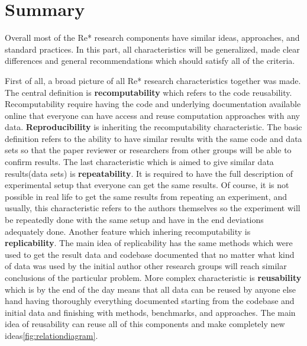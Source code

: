 \documentclass{vldb}
\begin{document}
\section{Summary}
Overall most of the Re* research components have similar ideas, approaches, and standard practices. In this part, all characteristics will be generalized, made clear differences and general recommendations which should satisfy all of the criteria.\par
First of all, a broad picture of all Re* research characteristics together was made. The central definition is \textbf{recomputability} which refers to the code reusability. Recomputability require having the code and underlying documentation available online that everyone can have access and reuse computation approaches with any data. \textbf{Reproducibility} is inheriting the recomputability characteristic. The basic definition refers to the ability to have similar results with the same code and data sets so that the paper reviewer or researchers from other groups will be able to confirm results. The last characteristic which is aimed to give similar data results(data sets) is \textbf{repeatability}. It is required to have the full description of experimental setup that everyone can get the same results. Of course, it is not possible in real life to get the same results from repeating an experiment, and usually, this characteristic refers to the authors themselves so the experiment will be repeatedly done with the same setup and have in the end deviations adequately done.  Another feature which inhering recomputability is \textbf{replicability}. The main idea of replicability has the same methods which were used to get the result data and codebase documented that no matter what kind of data was used by the initial author other research groups will reach similar conclusions of the particular problem. More complex characteristic is \textbf{reusability} which is by the end of the day means that all data can be reused by anyone else hand having thoroughly everything documented starting from the codebase and initial data and finishing with methods, benchmarks, and approaches. The main idea of reusability can reuse all of this components and make completely new ideas\ref{fig:relationdiagram}.\par
\end{document}
